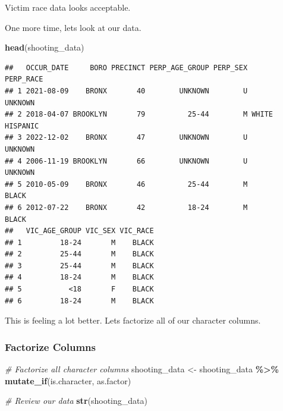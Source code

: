\documentclass[
]{article}
\newenvironment{Shaded}{\begin{snugshade}}{\end{snugshade}}
\newcommand{\CommentTok}[1]{\textcolor[rgb]{0.56,0.35,0.01}{\textit{#1}}}
\newcommand{\FunctionTok}[1]{\textcolor[rgb]{0.13,0.29,0.53}{\textbf{#1}}}
\newcommand{\NormalTok}[1]{#1}
\newcommand{\OtherTok}[1]{\textcolor[rgb]{0.56,0.35,0.01}{#1}}
\newcommand{\SpecialCharTok}[1]{\textcolor[rgb]{0.81,0.36,0.00}{\textbf{#1}}}
\begin{document}
Victim race data looks acceptable.

One more time, lets look at our data.

\begin{Shaded}
\begin{Highlighting}[]
\FunctionTok{head}\NormalTok{(shooting\_data)}
\end{Highlighting}
\end{Shaded}

\begin{verbatim}
##   OCCUR_DATE     BORO PRECINCT PERP_AGE_GROUP PERP_SEX      PERP_RACE
## 1 2021-08-09    BRONX       40        UNKNOWN        U        UNKNOWN
## 2 2018-04-07 BROOKLYN       79          25-44        M WHITE HISPANIC
## 3 2022-12-02    BRONX       47        UNKNOWN        U        UNKNOWN
## 4 2006-11-19 BROOKLYN       66        UNKNOWN        U        UNKNOWN
## 5 2010-05-09    BRONX       46          25-44        M          BLACK
## 6 2012-07-22    BRONX       42          18-24        M          BLACK
##   VIC_AGE_GROUP VIC_SEX VIC_RACE
## 1         18-24       M    BLACK
## 2         25-44       M    BLACK
## 3         25-44       M    BLACK
## 4         18-24       M    BLACK
## 5           <18       F    BLACK
## 6         18-24       M    BLACK
\end{verbatim}

This is feeling a lot better. Lets factorize all of our character
columns.

\subsubsection{Factorize Columns}\label{factorize-columns}

\begin{Shaded}
\begin{Highlighting}[]
\CommentTok{\# Factorize all character columns}
\NormalTok{shooting\_data }\OtherTok{\textless{}{-}}\NormalTok{ shooting\_data }\SpecialCharTok{\%\textgreater{}\%} 
  \FunctionTok{mutate\_if}\NormalTok{(is.character, as.factor)}
\end{Highlighting}
\end{Shaded}

\begin{Shaded}
\begin{Highlighting}[]
\CommentTok{\# Review our data}
\FunctionTok{str}\NormalTok{(shooting\_data)}
\end{Highlighting}
\end{Shaded}
\end{document}
